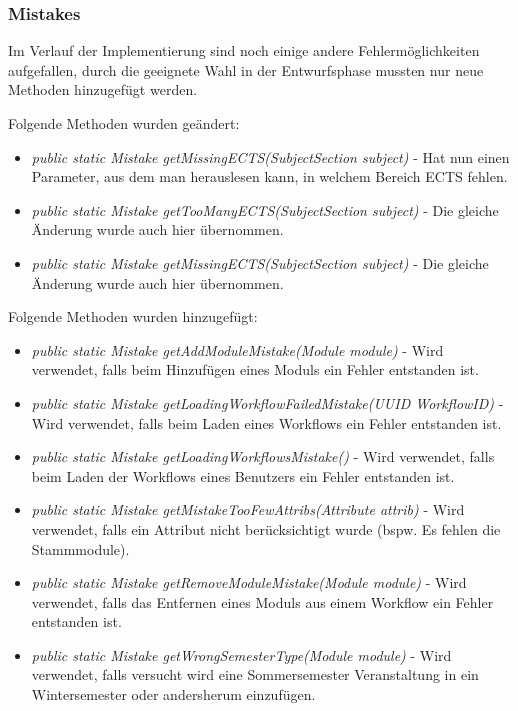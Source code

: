 \documentclass[parskip=full]{scrartcl}
\begin{document}
			\subsubsection{Mistakes}
				Im Verlauf der Implementierung sind noch einige andere Fehlermöglichkeiten aufgefallen, durch die geeignete Wahl in der Entwurfsphase mussten nur neue Methoden hinzugefügt werden.
				
				Folgende Methoden wurden geändert:
				\begin{itemize}
					\item \textit{public static Mistake getMissingECTS(SubjectSection subject)} - Hat nun einen Parameter, aus dem man herauslesen kann, in welchem Bereich ECTS fehlen.
					\item \textit{public static Mistake getTooManyECTS(SubjectSection subject)} - Die gleiche Änderung wurde auch hier übernommen.
					\item \textit{public static Mistake getMissingECTS(SubjectSection subject)} - Die gleiche Änderung wurde auch hier übernommen.
				\end{itemize}
			
				Folgende Methoden wurden hinzugefügt:
				\begin{itemize}
					\item \textit{public static Mistake getAddModuleMistake(Module module)} - Wird verwendet, falls beim Hinzufügen eines Moduls ein Fehler entstanden ist.
					\item \textit{public static Mistake getLoadingWorkflowFailedMistake(UUID WorkflowID)} - Wird verwendet, falls beim Laden eines Workflows ein Fehler entstanden ist.
					\item \textit{public static Mistake getLoadingWorkflowsMistake()} - Wird verwendet, falls beim Laden der Workflows eines Benutzers ein Fehler entstanden ist.
					\item \textit{public static Mistake getMistakeTooFewAttribs(Attribute attrib)} - Wird verwendet, falls ein Attribut nicht berücksichtigt wurde (bspw. Es fehlen die Stammmodule).
					\item \textit{public static Mistake getRemoveModuleMistake(Module module)} - Wird verwendet, falls das Entfernen eines Moduls aus einem Workflow ein Fehler entstanden ist.
					\item \textit{public static Mistake getWrongSemesterType(Module module)} - Wird verwendet, falls versucht wird eine Sommersemester Veranstaltung in ein Wintersemester oder andersherum einzufügen.
				\end{itemize}
			
\end{document}
